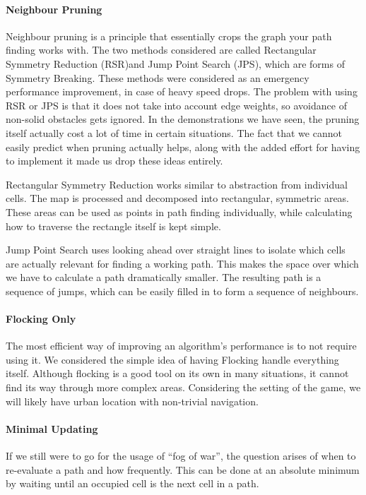 \paragraph{Neighbour Pruning}
Neighbour pruning is a principle that essentially crops the graph your path finding works with. The two methods considered are called Rectangular Symmetry Reduction (RSR)and Jump Point Search (JPS), which are forms of Symmetry Breaking. These methods were considered as an emergency performance improvement, in case of heavy speed drops. The problem with using RSR or JPS is that it does not take into account edge weights, so avoidance of non-solid obstacles gets ignored. In the demonstrations we have seen, the pruning itself actually cost a lot of time in certain situations. The fact that we cannot easily predict when pruning actually helps, along with the added effort for having to implement it made us drop these ideas entirely.

Rectangular Symmetry Reduction works similar to abstraction from individual cells. The map is processed and decomposed into rectangular, symmetric areas. These areas can be used as points in path finding individually, while calculating how to traverse the rectangle itself is kept simple.

Jump Point Search uses looking ahead over straight lines to isolate which cells are actually relevant for finding a working path. This makes the space over which we have to calculate a path dramatically smaller. The resulting path is a sequence of jumps, which can be easily filled in to form a sequence of neighbours.

\paragraph{Flocking Only}
The most efficient way of improving an algorithm's performance is to not require using it. We considered the simple idea of having Flocking handle everything itself. Although flocking is a good tool on its own in many situations, it cannot find its way through more complex areas. Considering the setting of the game, we will likely have urban location with non-trivial navigation.

\paragraph{Minimal Updating}
If we still were to go for the usage of ``fog of war'', the question arises of when to re-evaluate a path and how frequently. This can be done at an absolute minimum by waiting until an occupied cell is the next cell in a path.
